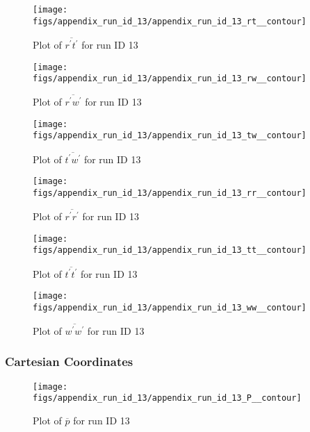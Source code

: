 \begin{figure}[H]
\centering
\texttt{[image: figs/appendix\_run\_id\_13/appendix\_run\_id\_13\_rt\_\_contour]}
\caption{Plot of $\overline{r^\prime t^\prime}$ for run ID 13}
\label{fig:appendix_run_id_13_rt__contour}
\end{figure}


\begin{figure}[H]
\centering
\texttt{[image: figs/appendix\_run\_id\_13/appendix\_run\_id\_13\_rw\_\_contour]}
\caption{Plot of $\overline{r^\prime w^\prime}$ for run ID 13}
\label{fig:appendix_run_id_13_rw__contour}
\end{figure}


\begin{figure}[H]
\centering
\texttt{[image: figs/appendix\_run\_id\_13/appendix\_run\_id\_13\_tw\_\_contour]}
\caption{Plot of $\overline{t^\prime w^\prime}$ for run ID 13}
\label{fig:appendix_run_id_13_tw__contour}
\end{figure}


\begin{figure}[H]
\centering
\texttt{[image: figs/appendix\_run\_id\_13/appendix\_run\_id\_13\_rr\_\_contour]}
\caption{Plot of $\overline{r^\prime r^\prime}$ for run ID 13}
\label{fig:appendix_run_id_13_rr__contour}
\end{figure}


\begin{figure}[H]
\centering
\texttt{[image: figs/appendix\_run\_id\_13/appendix\_run\_id\_13\_tt\_\_contour]}
\caption{Plot of $\overline{t^\prime t^\prime}$ for run ID 13}
\label{fig:appendix_run_id_13_tt__contour}
\end{figure}


\begin{figure}[H]
\centering
\texttt{[image: figs/appendix\_run\_id\_13/appendix\_run\_id\_13\_ww\_\_contour]}
\caption{Plot of $\overline{w^\prime w^\prime}$ for run ID 13}
\label{fig:appendix_run_id_13_ww__contour}
\end{figure}


\subsubsection{Cartesian Coordinates}
\begin{figure}[H]
\centering
\texttt{[image: figs/appendix\_run\_id\_13/appendix\_run\_id\_13\_P\_\_contour]}
\caption{Plot of $\overline{p}$ for run ID 13}
\label{fig:appendix_run_id_13_P__contour}
\end{figure}


